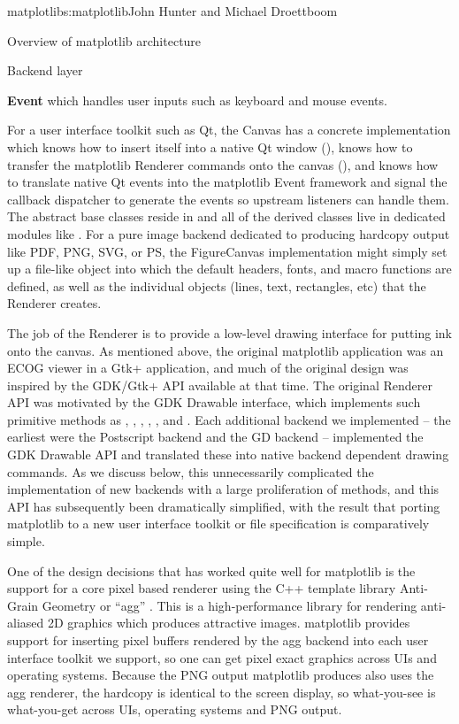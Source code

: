 \begin{aosachapter}{matplotlib}{s:matplotlib}{John Hunter and Michael Droettboom}
\begin{aosasect1}{Overview of matplotlib architecture}
\begin{aosasect2}{Backend layer}
\begin{aosaitemize}
\item \textbf{Event} which handles user inputs such as keyboard and
  mouse events.
\end{aosaitemize}
For a user interface toolkit such as Qt, the Canvas has a concrete
implementation which knows how to insert itself into a native Qt
window (), knows how to transfer the
matplotlib Renderer commands onto the canvas (),
and knows how to translate native Qt events into the matplotlib Event
framework and signal the callback dispatcher to generate the events so
upstream listeners can handle them.  The abstract base classes reside
in  and all of the derived classes
live in dedicated modules like
.  For a pure image backend
dedicated to producing hardcopy output like PDF, PNG, SVG, or PS, the
FigureCanvas implementation might simply set up a file-like object
into which the default headers, fonts, and macro functions are
defined, as well as the individual objects (lines, text, rectangles,
etc) that the Renderer creates.

The job of the Renderer is to provide a low-level drawing interface
for putting ink onto the canvas.  As mentioned above, the original
matplotlib application was an ECOG viewer in a Gtk+ application, and
much of the original design was inspired by the GDK/Gtk+ API available
at that time.  The original Renderer API was motivated by the GDK
Drawable interface, which implements such primitive methods as
, , ,
, , and .  Each
additional backend we implemented -- the earliest were the Postscript
backend and the GD backend -- implemented the GDK Drawable API and
translated these into native backend dependent drawing commands.  As
we discuss below, this unnecessarily complicated the implementation of
new backends with a large proliferation of methods, and this API has
subsequently been dramatically simplified, with the result that
porting matplotlib to a new user interface toolkit or file
specification is comparatively simple.

One of the design decisions that has worked quite well for matplotlib
is the support for a core pixel based renderer using the C++ template
library Anti-Grain Geometry or ``agg'' \cite{bib:agg}.  This is a
high-performance library for rendering anti-aliased 2D graphics which
produces attractive images.  matplotlib provides support for inserting
pixel buffers rendered by the agg backend into each user interface
toolkit we support, so one can get pixel exact graphics across UIs and
operating systems.  Because the PNG output matplotlib produces also
uses the agg renderer, the hardcopy is identical to the screen
display, so what-you-see is what-you-get across UIs, operating systems
and PNG output.


\end{aosasect2}
\end{aosasect1}
\end{aosachapter}
